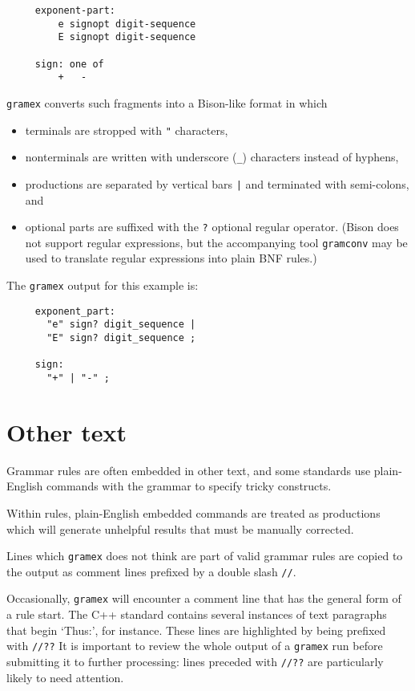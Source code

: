 \documentclass[11pt]{article}
\newcommand{\lt}{\tt}
\begin{document}
\begin{verbatim}
     exponent-part:
         e signopt digit-sequence
         E signopt digit-sequence

     sign: one of
         +   -
\end{verbatim}

{\lt gramex} converts such fragments into a Bison-like format in which
\begin{itemize}
\item terminals are stropped with {\tt "} characters, 
\item nonterminals are
written with underscore (\verb+_+) characters instead of hyphens,
\item productions are
separated by vertical bars {\tt |} and terminated with semi-colons, and
\item  optional parts are suffixed with the {\tt ?} optional regular
operator. (Bison does not support regular expressions, but the
accompanying tool {\lt gramconv} may be used to translate regular
expressions into plain BNF rules.) 
\end{itemize}
The {\lt gramex} output for this
example is:

\begin{verbatim}
     exponent_part:
       "e" sign? digit_sequence |
       "E" sign? digit_sequence ;

     sign:
       "+" | "-" ;
\end{verbatim}

\section{Other text}
Grammar rules are often embedded in other text, and some standards use
plain-English commands with the grammar to specify tricky
constructs.

Within rules, plain-English embedded commands are treated as
productions which will generate unhelpful results that must be
manually corrected.  

Lines which {\lt gramex} does not think are part of valid grammar
rules are copied to the output as comment lines prefixed by a double
slash \verb+//+. 

Occasionally, {\lt gramex} will encounter a comment line that has the
general form of a rule start. The C++ standard contains several
instances of text paragraphs that begin `Thus:', for instance. These
lines are highlighted by being prefixed with \verb+//??+ It is
important to review the whole output of a {\lt gramex} run before
submitting it to further processing: lines preceded with \verb+//??+
are particularly likely to need attention.
\end{document}
